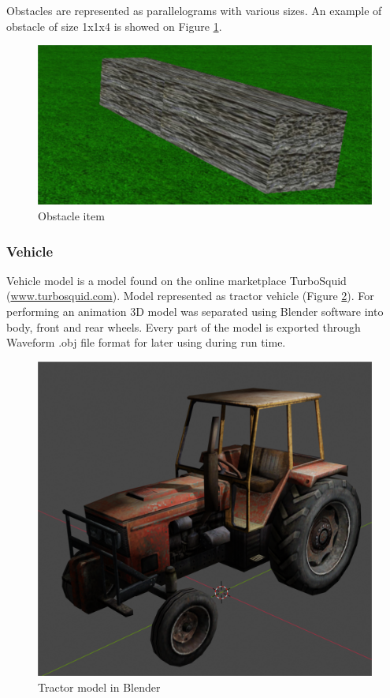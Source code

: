 \documentclass[12pt]{article}
\begin{document}
\par
Obstacles are represented as parallelograms with various sizes. An example of obstacle of size 1x1x4 is showed on Figure \ref{obstacle_item}.

\begin{figure}[h!]
\begin{center}
\includegraphics[scale=0.8]{images/obstacle2.png}
\end{center}
\caption{Obstacle item}
\label{obstacle_item}
\end{figure}

\subsubsection{Vehicle}
Vehicle model is a model found on the online marketplace TurboSquid (\url{www.turbosquid.com}). Model represented as tractor vehicle (Figure \ref{tractor1}). For performing an animation 3D model was separated using Blender software into body, front and rear wheels. Every part of the model is exported through Waveform .obj file format for later using during run time. 

\begin{figure}[h!]
\begin{center}
\includegraphics[scale=0.8]{images/tractor_blender.png}
\end{center}
\caption{Tractor model in Blender}
\label{tractor1}
\end{figure}
\end{document}
